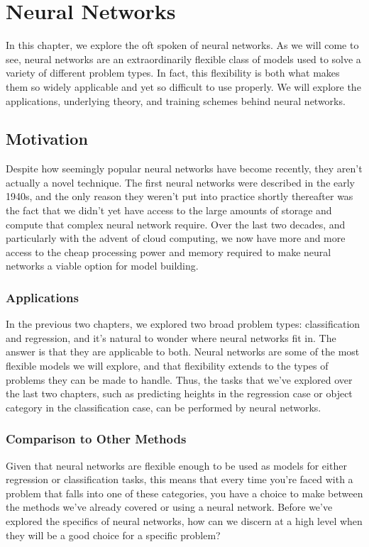 \chapter{Neural Networks}
In this chapter, we explore the oft spoken of neural networks. As we will come to see, neural networks are an extraordinarily flexible class of models used to solve a variety of different problem types. In fact, this flexibility is both what makes them so widely applicable and yet so difficult to use properly. We will explore the applications, underlying theory, and training schemes behind neural networks.

\section{Motivation}
Despite how seemingly popular neural networks have become recently, they aren't actually a novel technique. The first neural networks were described in the early 1940s, and the only reason they weren't put into practice shortly thereafter was the fact that we didn't yet have access to the large amounts of storage and compute that complex neural network require. Over the last two decades, and particularly with the advent of cloud computing, we now have more and more access to the cheap processing power and memory required to make neural networks a viable option for model building.

\subsection{Applications}
In the previous two chapters, we explored two broad problem types: classification and regression, and it's natural to wonder where neural networks fit in. The answer is that they are applicable to both. Neural networks are some of the most flexible models we will explore, and that flexibility extends to the types of problems they can be made to handle. Thus, the tasks that we've explored over the last two chapters, such as predicting heights in the regression case or object category in the classification case, can be performed by neural networks.

\subsection{Comparison to Other Methods}
Given that neural networks are flexible enough to be used as models for either regression or classification tasks, this means that every time you're faced with a problem that falls into one of these categories, you have a choice to make between the methods we've already covered or using a neural network. Before we've explored the specifics of neural networks, how can we discern at a high level when they will be a good choice for a specific problem?


